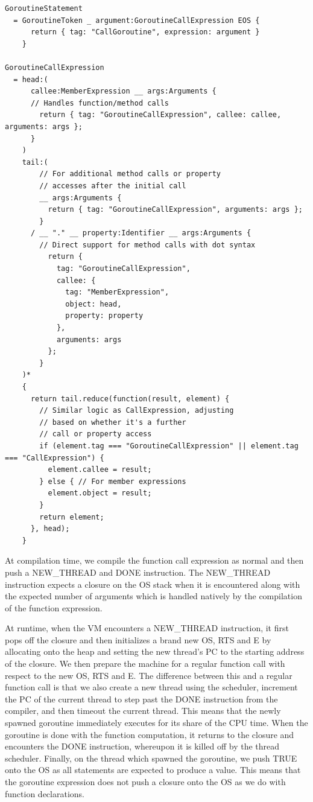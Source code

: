 \documentclass{report}
\begin{document}
\begin{verbatim}
GoroutineStatement
  = GoroutineToken _ argument:GoroutineCallExpression EOS {
      return { tag: "CallGoroutine", expression: argument }
    }

GoroutineCallExpression
  = head:(
      callee:MemberExpression __ args:Arguments { 
      // Handles function/method calls
        return { tag: "GoroutineCallExpression", callee: callee, arguments: args };
      }
    )
    tail:(
        // For additional method calls or property 
        // accesses after the initial call
        __ args:Arguments {
          return { tag: "GoroutineCallExpression", arguments: args };
        }
      / __ "." __ property:Identifier __ args:Arguments { 
        // Direct support for method calls with dot syntax
          return {
            tag: "GoroutineCallExpression",
            callee: {
              tag: "MemberExpression",
              object: head,
              property: property
            },
            arguments: args
          };
        }
    )*
    {
      return tail.reduce(function(result, element) {
        // Similar logic as CallExpression, adjusting 
        // based on whether it's a further 
        // call or property access
        if (element.tag === "GoroutineCallExpression" || element.tag === "CallExpression") {
          element.callee = result;
        } else { // For member expressions
          element.object = result;
        }
        return element;
      }, head);
    }
\end{verbatim}

At compilation time, we compile the function call expression as normal and then push a NEW\_THREAD and DONE instruction. The NEW\_THREAD instruction expects a closure on the OS stack when it is encountered along with the expected number of arguments which is handled natively by the compilation of the function expression. 

At runtime, when the VM encounters a NEW\_THREAD instruction, it first pops off the closure and then initializes a brand new OS, RTS and E by allocating onto the heap and setting the new thread's PC to the starting address of the closure. We then prepare the machine for a regular function call with respect to the new OS, RTS and E. The difference between this and a regular function call is that we also create a new thread using the scheduler, increment the PC of the current thread to step past the DONE instruction from the compiler, and then timeout the current thread. This means that the newly spawned goroutine immediately executes for its share of the CPU time. When the goroutine is done with the function computation, it returns to the closure and encounters the DONE instruction, whereupon it is killed off by the thread scheduler. Finally, on the thread which spawned the goroutine, we push TRUE onto the OS as all statements are expected to produce a value. This means that the goroutine expression does not push a closure onto the OS as we do with function declarations.
\end{document}

